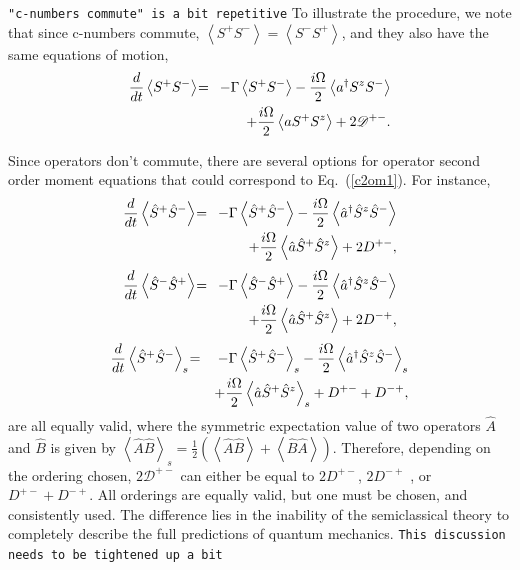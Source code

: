 \documentclass[aps,prl,twocolumn,
superscriptaddress,groupedaddress]{revtex4}
\newcommand{\dmcomment}[1]{{\tt #1}}
\begin{document}
\dmcomment{"c-numbers commute" is a bit repetitive}
To illustrate the procedure, we note that since c-numbers commute,
$\left<S^{+}S^{-} \right> = \left<S^{-}S^{+} \right>$, and they also
have the same equations of motion,
\begin{eqnarray}
\frac{d}{dt} \left<S^{+}S^{-} \right>  \hspace{-0.03in} &=&
\hspace{-0.03in}  - \Gamma  \left< S^{+} S^{-} \right>
-\frac{i \Omega}{2} \left< a^{\dagger} S^{z} S^{-} \right>
\nonumber
\\
 && +\frac{i \Omega}{2} \left< a S^{+} S^{z} \right> + 2 \mathscr{D}^{+-}.
 \label{c2om1}
\end{eqnarray}

Since operators don't commute, there are several options for operator
second order moment equations that could correspond to
Eq.~(\ref{c2om1}). For instance,
\begin{eqnarray}
\frac{d}{dt} \left<\hat{S}^{+}\hat{S}^{-} \right>  \hspace{-0.03in} &=&
\hspace{-0.03in}  - \Gamma  \left< \hat{S}^{+} \hat{S}^{-} \right>
-\frac{i \Omega}{2} \left< \hat{a}^{\dagger} \hat{S}^{z} \hat{S}^{-} \right>
\nonumber
\\
 &&+\frac{i \Omega}{2}  \left< \hat{a} \hat{S}^{+} \hat{S}^{z} \right>  +
 2 D^{+-},
\end{eqnarray}
\begin{eqnarray}
\frac{d}{dt} \left<\hat{S}^{-}\hat{S}^{+} \right>  \hspace{-0.03in} &=&
\hspace{-0.03in}  - \Gamma  \left< \hat{S}^{-} \hat{S}^{+} \right>
-\frac{i \Omega}{2} \left< \hat{a}^{\dagger} \hat{S}^{z} \hat{S}^{-} \right>
\nonumber
\\
 &&+\frac{i \Omega}{2}  \left< \hat{a} \hat{S}^{+} \hat{S}^{z} \right>  +
 2 D^{-+},
\end{eqnarray}
\begin{eqnarray}
\frac{d}{dt} \left<\hat{S}^{+}\hat{S}^{-} \right>_s  \hspace{-0.03in} &=&
\hspace{-0.03in}  - \Gamma  \left< \hat{S}^{+} \hat{S}^{-} \right>_s
-\frac{i \Omega}{2} \left< \hat{a}^{\dagger} \hat{S}^{z} \hat{S}^{-} \right> _s
\nonumber
\\
 &&+\frac{i \Omega}{2}  \left< \hat{a} \hat{S}^{+} \hat{S}^{z} \right>_s +
 D^{+-} +D^{-+},
 \nonumber
\\
\end{eqnarray}
are all equally valid, where the symmetric expectation value of two
operators $\hat{A}$ and $\hat{B}$ is given by $\left< \hat{A} \hat{B}
\right>_s=\frac{1}{2} \left( \left< \hat{A} \hat{B} \right> + \left<
\hat{B} \hat{A} \right> \right)$. Therefore, depending on the ordering
chosen, $2 \mathscr{D}^{+-}$ can either be equal to $2 D^{+-}$,  $2
D^{-+}$ , or $D^{+-}+D^{-+}$. All orderings are equally valid, but one
must be chosen, and consistently used. The difference lies in the
inability of the semiclassical theory to completely describe the full
predictions of quantum mechanics.
\dmcomment{This discussion needs to be tightened up a bit}
\end{document}
